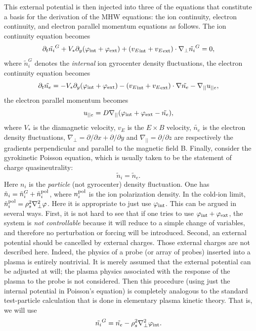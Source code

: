 \documentclass[12pt,lot, lof]{puthesis}
\begin{document}
This external potential is then injected into three of the equations that constitute a basis for the derivation of the MHW equations: the ion continuity, electron continuity, and electron parallel momentum equations as follows. The ion continuity equation becomes
%
\begin{equation}
	\partial_t \tilde{n_i}^G +V_{*} \partial_y (\varphi_{\rm int} +\varphi_{\rm ext} )+ ({v_E}_{\rm int} + {v_E}_{ \rm ext}) \cdot \nabla_{\perp} \tilde{n_i}^G  = 0,
\end{equation}
where $\tilde n_i^G$ denotes the \emph{internal} ion gyrocenter density fluctuations, the electron continuity equation becomes
%
\begin{equation}
	\partial_t \tilde{n_e} = - V_{*} \partial_y (\varphi_{\rm int} +\varphi_{\rm ext} ) - ({v_E}_{\rm int} + {v_E}_{\rm ext})    \cdot \nabla \tilde{n_e} - \nabla_{||}  u_{|| e},
\end{equation}
the electron parallel momentum becomes
%
\begin{equation}
	u_{|| e} = D \nabla_{||} (\varphi_{\rm int} +\varphi_{\rm ext}  - \tilde{n_e}),
\end{equation}
where $V_{*}$ is the diamagnetic velocity, $v_E$ is the $E \times B$ velocity, $\tilde{n_e}$ is the electron density fluctuations, $ \nabla_{\perp} = \partial / \partial x+ \partial / \partial y$ and $ \nabla_{||} =\partial / \partial z$ are respectively the gradients perpendicular and parallel to the magnetic field B.
Finally, consider the gyrokinetic Poisson equation, which is usually taken to be the statement of charge quasineutrality:
\begin{equation}
\tilde n_i = \tilde{n}_e.
\end{equation}
Here $n_i$ is the \emph{particle} (not gyrocenter) density fluctuation.  One has $\tilde n_i = \tilde n_i^G + \tilde n_i^{\rm pol}$, where $n_i^{\rm pol}$ is the ion polarization density.  In the cold-ion limit, $\tilde n_i^{\rm pol} = \rho_s^2 \nabla_\perp^2\varphi$.  Here it is appropriate to just use $\varphi_{\rm int}$.  This can be argued in several ways.  First, it is not hard to see that if one tries to use $\varphi_{\rm int} + \varphi_{\rm ext}$, the system is \emph{not controllable} because it will reduce to a simple change of variables, and therefore no perturbation or forcing will be introduced.  Second, an external potential should be cancelled by external charges. Those external charges are not described here.  Indeed, the physics of a probe (or array of probes) inserted into a plasma is entirely nontrivial.  It is merely assumed that the external potential can be adjusted at will; the plasma physics associated with the response of the plasma to the probe is not considered.  Then this procedure (using just the internal potential in Poisson's equation) is completely analogous to the standard test-particle calculation that is done in elementary plasma kinetic theory. That is, we will use
\begin{equation}
	\tilde{n_i}^G  =  \tilde{n_e} - \rho_s^2 \nabla_{\perp}^2 \varphi_{\rm int}.
\end{equation}
\end{document}
